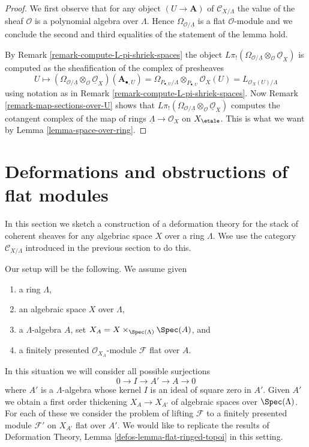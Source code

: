 \begin{proof}
We first observe that for any object $(U \to \mathbf{A})$ of
$\mathcal{C}_{X/\Lambda}$
the value of the sheaf $\mathcal{O}$ is a polynomial algebra over $\Lambda$.
Hence $\Omega_{\mathcal{O}/\underline{\Lambda}}$ is a flat $\mathcal{O}$-module
and we conclude the second and third equalities of the statement of the
lemma hold.

\medskip\noindent
By Remark \ref{remark-compute-L-pi-shriek-spaces} the object
$L\pi_!(\Omega_{\mathcal{O}/\underline{\Lambda}}
\otimes_\mathcal{O} \underline{\mathcal{O}}_X)$
is computed as the sheafification of the complex of presheaves
$$
U \mapsto
\left(\Omega_{\mathcal{O}/\underline{\Lambda}}
\otimes_\mathcal{O} \underline{\mathcal{O}}_X\right)(\mathbf{A}_{\bullet, U})
=
\Omega_{P_{\bullet, U}/\Lambda} \otimes_{P_{\bullet, U}} \mathcal{O}_X(U) =
L_{\mathcal{O}_X(U)/\Lambda}
$$
using notation as in Remark \ref{remark-compute-L-pi-shriek-spaces}.
Now Remark \ref{remark-map-sections-over-U} shows that
$L\pi_!(\Omega_{\mathcal{O}/\underline{\Lambda}}
\otimes_\mathcal{O} \underline{\mathcal{O}}_X)$
computes the cotangent complex of the map of rings
$\underline{\Lambda} \to \mathcal{O}_X$ on $X_\etale$.
This is what we want by Lemma \ref{lemma-space-over-ring}.
\end{proof}









\section{Deformations and obstructions of flat modules}
\label{section-modules}

\noindent
In this section we sketch a construction of a deformation theory for the
stack of coherent sheaves for any algebriac space $X$ over a ring $\Lambda$.
Wse use the category $\mathcal{C}_{X/\Lambda}$ introduced
in the previous section to do this.

\medskip\noindent
Our setup will be the following. We assume given
\begin{enumerate}
\item a ring $\Lambda$,
\item an algebraic space $X$ over $\Lambda$,
\item a $\Lambda$-algebra $A$, set
$X_A = X \times_{\Spec(\Lambda)} \Spec(A)$, and
\item a finitely presented $\mathcal{O}_{X_A}$-module $\mathcal{F}$
flat over $A$.
\end{enumerate}
In this situation we will consider all possible surjections
$$
0 \to I \to A' \to A \to 0
$$
where $A'$ is a $\Lambda$-algebra whose kernel $I$ is an ideal of square zero
in $A'$. Given $A'$ we obtain a first order thickening $X_A \to X_{A'}$
of algebraic spaces over $\Spec(\Lambda)$. For each of these we consider
the problem of lifting $\mathcal{F}$ to a finitely presented module
$\mathcal{F}'$ on $X_{A'}$ flat over $A'$. We would like to replicate the
results of Deformation Theory, Lemma \ref{defos-lemma-flat-ringed-topoi}
in this setting.

